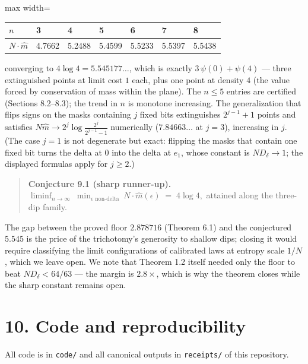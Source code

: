 \documentclass[11pt]{article}
\begin{document}
\begin{center}
\begin{adjustbox}{max width=\textwidth}
\begin{tabular}{lllllll}
$n$ & 3 & 4 & 5 & 6 & 7 & 8 \\
\hline
$N \cdot \widehat m$ & 4.7662 & 5.2488 & 5.4599 & 5.5233 & 5.5397 & 5.5438 \\
\end{tabular}
\end{adjustbox}
\end{center}
converging to $4\log4 = 5.545177\ldots$, which is exactly $3\,\psi(0) + \psi(4)$ — three extinguished points at limit cost $1$ each, plus one point at density $4$ (the value forced by conservation of mass within the plane).  The $n \le 5$ entries are certified (Sections 8.2–8.3); the trend in $n$ is monotone increasing.  The generalization that flips signs on the masks containing $j$ fixed bits extinguishes $2^{j-1}+1$ points and satisfies $N\widehat m \to 2^j\log\frac{2^j}{2^{j-1}-1}$ numerically ($7.84663\ldots$ at $j=3$), increasing in $j$.  (The case $j = 1$ is not degenerate but exact: flipping the masks that contain one fixed bit turns the delta at $0$ into the delta at $e_1$, whose constant is $N D_\delta \to 1$; the displayed formulas apply for $j \ge 2$.)

\begin{quote}
\textbf{Conjecture 9.1 (sharp runner-up).}  $\displaystyle \liminf_{n\to\infty}\ \min_{\epsilon \text{ non-delta}}\ N\cdot\widehat m(\epsilon) \;=\; 4\log 4 ,$ attained along the three-dip family.
\end{quote}
The gap between the proved floor $2.878716$ (Theorem 6.1) and the conjectured $5.545$ is the price of the trichotomy's generosity to shallow dips; closing it would require classifying the limit configurations of calibrated laws at entropy scale $1/N$, which we leave open.  We note that Theorem 1.2 itself needed only the floor to beat $N D_\delta < 64/63$ — the margin is $2.8\times$, which is why the theorem closes while the sharp constant remains open.

\section*{10. Code and reproducibility}
All code is in \texttt{code/} and all canonical outputs in \texttt{receipts/} of this repository.
\end{document}
